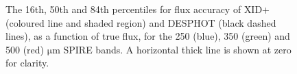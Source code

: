 \documentclass[useAMS,usenatbib]{mnras}
\begin{document}
\begin{figure}
\centering 
\caption{The 16th, 50th and 84th percentiles for flux accuracy of \textsc{XID+} (coloured line and shaded region) and \textsc{DESPHOT} (black dashed lines), as a function of true flux, for the 250 (blue), 350 (green) and 500 (red) $\mathrm{\mu m}$ SPIRE bands. A horizontal thick line is shown at zero for clarity.}\label{fig:accuracy}
\end{figure}
\end{document}
